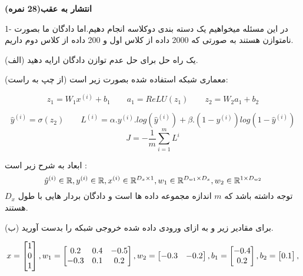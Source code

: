 \textbf{انتشار به عقب(28 نمره)}

1- در این مسئله میخواهیم یک دسته بندی دوکلاسه انجام دهیم.اما دادگان ما بصورت نامتوازن هستند به صورتی که 2000 داده از کلاس اول و 200 داده از کلاس دوم داریم.

(الف) یک راه حل برای حل عدم توازن دادگان ارایه دهید.

\vspace{2cm}

معماری شبکه استفاده شده بصورت زیر است (از چپ به راست):

\begin{equation}
z_{1} = W_1 x^{(i)}+b_1 
\qquad
a_{1} = ReLU(z_1)
\qquad
z_{2} = W_2 a_1+b_2 
\end{equation}

\begin{equation}
\hat{y}^{(i)} = \sigma(z_2)
\qquad
L^{(i)} = \alpha . y^{(i)} . log(\hat{y}^{(i)})+ \beta  .(1-y^{(i)})log (1-\hat{y}^{(i)})
\end{equation}
\begin{equation}
J = -\frac{1}{m} \sum_{i=1}^{m} L^{i}
\end{equation}

ابعاد به شرح زیر است :
\begin{equation}
\hat{y}^{(i)} \in \mathbb{R}, \space  y^{(i)} \in \mathbb{R}, \space x^{(i)} \in \mathbb{R}^{D_x \times 1}, \space w_1 \in \mathbb{R}^{D_{w1} \times D_x}, \space w_2 \in \mathbb{R}^{ 1 \times D_{w2}}
\end{equation}
توجه داشته باشد که $m$ اندازه مجموعه داده ها است و دادگان بردار هایی با طول $D_x$ هستند.

(ب) برای مقادیر زیر و به ازای ورودی داده شده خروجی شبکه را بدست آورید.

\begin{equation}
x = \begin{bmatrix}
1 \\
0 \\
1
\end{bmatrix}, \space
w_1 = \begin{bmatrix}
0.2&0.4&-0.5 \\
-0.3&0.1&0.2
\end{bmatrix}, \space
w_2 = \begin{bmatrix}
-0.3&-0.2 \\
\end{bmatrix}, \space
b_1 = \begin{bmatrix}
-0.4\\
0.2
\end{bmatrix}, \space
b_2 = \begin{bmatrix}
0.1\\
\end{bmatrix}, \space
\end{equation}

